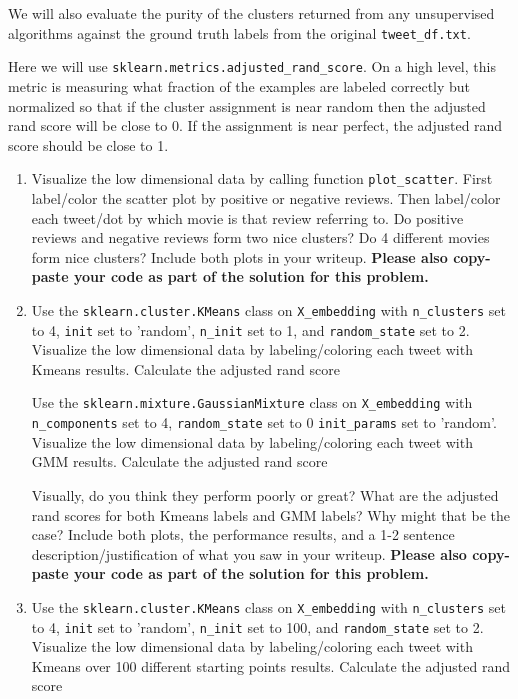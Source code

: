 \documentclass[11pt]{article}
\begin{document}
We will also evaluate the purity of the clusters returned from any unsupervised algorithms against the ground truth labels from the original \verb|tweet_df.txt|. 


Here we will use \verb|sklearn.metrics.adjusted_rand_score|. On a high level, this metric is measuring what fraction of the examples are labeled correctly but normalized so that if the cluster assignment is near random then the adjusted rand score will be close to 0. If the assignment is near perfect, the adjusted rand score should be close to 1. 

\begin{enumerate}

\item {} Visualize the low dimensional data by calling function \verb|plot_scatter|. First label/color the scatter plot by positive or negative reviews. Then label/color each tweet/dot by which movie is that review referring to. Do positive reviews and negative reviews form two nice clusters? Do 4 different movies form nice clusters? Include both plots in your writeup. \textbf{Please also copy-paste your code as part of the solution for this problem.}\newline
\solution{}


\item {} Use the \verb|sklearn.cluster.KMeans| class on \verb|X_embedding| with \verb|n_clusters| set to 4, \verb|init| set to 'random', \verb|n_init| set to 1, and \verb|random_state| set to 2. Visualize the low dimensional data by labeling/coloring each tweet with Kmeans results. Calculate the adjusted rand score

Use the \verb|sklearn.mixture.GaussianMixture| class on \verb|X_embedding| with \verb|n_components| set to 4, \verb|random_state| set to 0 \verb|init_params| set to 'random'. 
Visualize the low dimensional data by labeling/coloring each tweet with GMM results. Calculate the adjusted rand score

Visually, do you think they perform poorly or great? What are the adjusted rand scores for both Kmeans labels and GMM labels? Why might that be the case? Include both plots, the performance results, and a 1-2 sentence description/justification of what you saw in your writeup. \textbf{Please also copy-paste your code as part of the solution for this problem.}\newline
\solution{}

\item {} 
Use the \verb|sklearn.cluster.KMeans| class on \verb|X_embedding| with \verb|n_clusters| set to 4, \verb|init| set to 'random', \verb|n_init| set to 100, and \verb|random_state| set to 2.
Visualize the low dimensional data by labeling/coloring each tweet with Kmeans over 100 different starting points results. Calculate the adjusted rand score


\end{enumerate}
\end{document}
